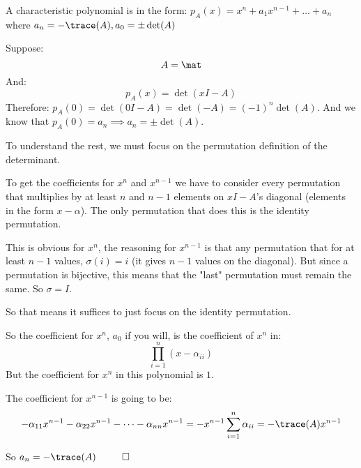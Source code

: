 \documentclass[10pt]{article}
\begin{document}
\newpage
\begin{statement}{A characteristic polynomial is in the form: $p_A(x) = x^n + a_1x^{n-1} + \dots + a_n$ where $a_n = -\trace(A), a_0 = \pm\det(A)$}

Suppose:
\[ A = \mat \]
And:
\[ p_A(x) = \det(xI - A) \]
Therefore: $p_A(0) = \det(0I-A)=\det(-A)=(-1)^n\det(A)$. And we know that $p_A(0)=a_n\implies a_n=\pm\det(A)$.

To understand the rest, we must focus on the permutation definition of the determinant.

To get the coefficients for $x^n$ and $x^{n-1}$ we have to consider every permutation that multiplies by at least $n$ and $n-1$ elements on $xI-A$'s diagonal (elements in the form $x-\alpha$). The only permutation that does this is the identity permutation. 

This is obvious for $x^n$, the reasoning for $x^{n-1}$ is that any permutation that for at least $n-1$ values, $\sigma(i)=i$ (it gives $n-1$ values on the diagonal). But since a permutation is bijective, this means that the "last" permutation must remain the same. So $\sigma=I$.

So that means it suffices to just focus on the identity permutation.

So the coefficient for $x^n$, $a_0$ if you will, is the coefficient of $x^n$ in:
\[ \prod_{i=1}^n (x-\alpha_{ii}) \]
But the coefficient for $x^n$ in this polynomial is $1$.

The coefficient for $x^{n-1}$ is going to be:
\[ -\alpha_{11}x^{n-1} - \alpha_{22}x^{n-1} -\dots- \alpha_{nn}x^{n-1} = -x^{n-1}\sum_{i=1}^n \alpha_{ii} = -\trace(A)x^{n-1} \]

So $a_n = -\trace(A) ~~ \qed$

\end{statement}
\end{document}
